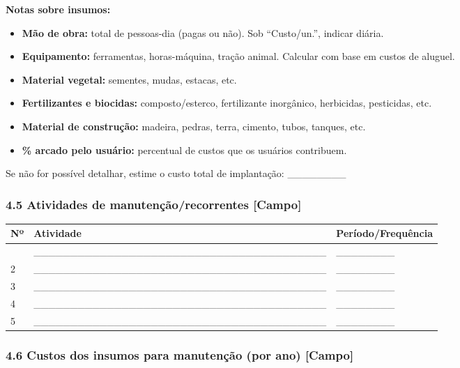 \textbf{Notas sobre insumos:}

\begin{itemize}
\tightlist
\item
  \textbf{Mão de obra:} total de pessoas-dia (pagas ou não). Sob ``Custo/un.'', indicar diária.
\item
  \textbf{Equipamento:} ferramentas, horas-máquina, tração animal. Calcular com base em custos de aluguel.
\item
  \textbf{Material vegetal:} sementes, mudas, estacas, etc.
\item
  \textbf{Fertilizantes e biocidas:} composto/esterco, fertilizante inorgânico, herbicidas, pesticidas, etc.
\item
  \textbf{Material de construção:} madeira, pedras, terra, cimento, tubos, tanques, etc.
\item
  \textbf{\% arcado pelo usuário:} percentual de custos que os usuários contribuem.
\end{itemize}

Se não for possível detalhar, estime o custo total de implantação: \_\_\_\_\_\_\_\_

\subsubsection{4.5 Atividades de manutenção/recorrentes {[Campo]}}\label{atividades-de-manutenuxe7uxe3orecorrentes}

{
\begin{longtable}[]{@{}lll@{}}
\toprule\noalign{}
Nº & Atividade & Período/Frequência \\
\midrule\noalign{}
\endhead
\bottomrule\noalign{}
\endlastfoot
1 & \_\_\_\_\_\_\_\_\_\_\_\_\_\_\_\_\_\_\_\_\_\_\_\_\_\_\_\_\_\_\_\_\_\_\_\_\_\_\_\_ & \_\_\_\_\_\_\_\_ \\
2 & \_\_\_\_\_\_\_\_\_\_\_\_\_\_\_\_\_\_\_\_\_\_\_\_\_\_\_\_\_\_\_\_\_\_\_\_\_\_\_\_ & \_\_\_\_\_\_\_\_ \\
3 & \_\_\_\_\_\_\_\_\_\_\_\_\_\_\_\_\_\_\_\_\_\_\_\_\_\_\_\_\_\_\_\_\_\_\_\_\_\_\_\_ & \_\_\_\_\_\_\_\_ \\
4 & \_\_\_\_\_\_\_\_\_\_\_\_\_\_\_\_\_\_\_\_\_\_\_\_\_\_\_\_\_\_\_\_\_\_\_\_\_\_\_\_ & \_\_\_\_\_\_\_\_ \\
5 & \_\_\_\_\_\_\_\_\_\_\_\_\_\_\_\_\_\_\_\_\_\_\_\_\_\_\_\_\_\_\_\_\_\_\_\_\_\_\_\_ & \_\_\_\_\_\_\_\_ \\
\end{longtable}
}

\subsubsection{4.6 Custos dos insumos para manutenção (por ano) {[Campo]}}\label{custos-dos-insumos-para-manutenuxe7uxe3o-por-ano}

